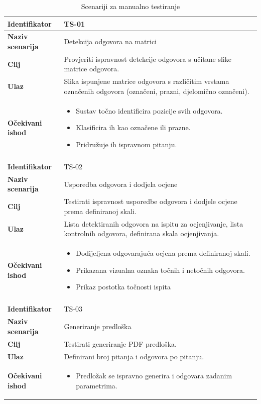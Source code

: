 \documentclass{foi}
\begin{document}
\begin{table}[H]
\centering
\begin{tabular}{|l|p{11cm}|}
\hline
\textbf{Identifikator} & TS-01 \\ \hline
\textbf{Naziv scenarija} & Detekcija odgovora na matrici \\ \hline
\textbf{Cilj} & Provjeriti ispravnost detekcije odgovora s učitane slike matrice odgovora. \\ \hline
\textbf{Ulaz} & Slika ispunjene matrice odgovora s različitim vrstama označenih odgovora (označeni, prazni, djelomično označeni). \\ \hline
\textbf{Očekivani ishod} & 
\begin{itemize}
    \item Sustav točno identificira pozicije svih odgovora.
    \item Klasificira ih kao označene ili prazne.
    \item Pridružuje ih ispravnom pitanju.
\end{itemize} \\ \hline
\multicolumn{2}{|c|}{} \\ \hline

\textbf{Identifikator} & TS-02 \\ \hline
\textbf{Naziv scenarija} & Usporedba odgovora i dodjela ocjene \\ \hline
\textbf{Cilj} & Testirati ispravnost usporedbe odgovora i dodjele ocjene prema definiranoj skali. \\ \hline
\textbf{Ulaz} & Lista detektiranih odgovora na ispitu za ocjenjivanje, lista kontrolnih odgovora, definirana skala ocjenjivanja. \\ \hline
\textbf{Očekivani ishod} & 
\begin{itemize}
    \item Dodijeljena odgovarajuća ocjena prema definiranoj skali.
    \item Prikazana vizualna oznaka točnih i netočnih odgovora.
    \item Prikaz postotka točnosti ispita
\end{itemize} \\ \hline
\multicolumn{2}{|c|}{} \\ \hline

\textbf{Identifikator} & TS-03 \\ \hline
\textbf{Naziv scenarija} & Generiranje predloška \\ \hline
\textbf{Cilj} & Testirati generiranje PDF predloška. \\ \hline
\textbf{Ulaz} & Definirani broj pitanja i odgovora po pitanju. \\ \hline
\textbf{Očekivani ishod} & 
\begin{itemize}
    \item Predložak se ispravno generira i odgovara zadanim parametrima.
\end{itemize} \\ \hline
\end{tabular}
\caption{Scenariji za manualno testiranje}
\end{table}
\end{document}
